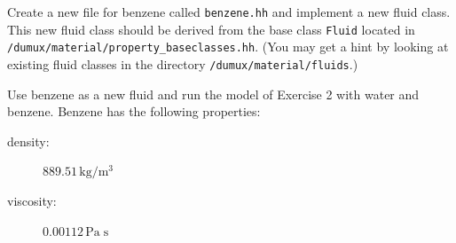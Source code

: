 Create a new file for benzene called \texttt{benzene.hh} and implement
a new fluid class. This new fluid class should be derived from the
base class \texttt{Fluid} located in
\texttt{/dumux/material/property\_baseclasses.hh}.  (You may get a
hint by looking at existing fluid classes in the directory
\texttt{/dumux/material/fluids}.)

Use benzene as a new fluid and run the model of Exercise 2 with water
and benzene. Benzene has the following properties:
\begin{description}
  \item[density:] $889.51 \, \text{kg} / \text{m}^3$
  \item[viscosity:] $0.00112 \, \text{Pa} \; \text{s}$
\end{description}

